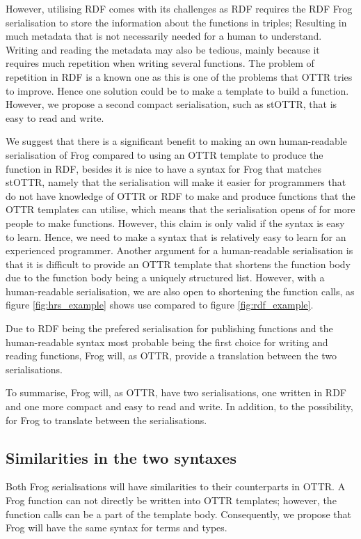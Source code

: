 \para
However, utilising RDF comes with its challenges as RDF requires the RDF Frog serialisation to store the information about the functions in triples; Resulting in much metadata that is not necessarily needed for a human to understand. Writing and reading the metadata may also be tedious, mainly because it requires much repetition when writing several functions. The problem of repetition in RDF is a known one as this is one of the problems that OTTR tries to improve. Hence one solution could be to make a template to build a function. However, we propose a second compact serialisation, such as stOTTR, that is easy to read and write. 

\para
We suggest that there is a significant benefit to making an own human-readable serialisation of Frog compared to using an OTTR template to produce the function in RDF, besides it is nice to have a syntax for Frog that matches stOTTR, namely that the serialisation will make it easier for programmers that do not have knowledge of OTTR or RDF to make and produce functions that the OTTR templates can utilise, which means that the serialisation opens of for more people to make functions. However, this claim is only valid if the syntax is easy to learn. Hence, we need to make a syntax that is relatively easy to learn for an experienced programmer. Another argument for a human-readable serialisation is that it is difficult to provide an OTTR template that shortens the function body due to the function body being a uniquely structured list. However, with a human-readable serialisation, we are also open to shortening the function calls, as figure \ref{fig:hrs_example} shows use compared to figure \ref{fig:rdf_example}. 

\para
Due to RDF being the prefered serialisation for publishing functions and the human-readable syntax most probable being the first choice for writing and reading functions, Frog will, as OTTR, provide a translation between the two serialisations. 

\para
To summarise, Frog will, as OTTR, have two serialisations, one written in RDF and one more compact and easy to read and write. In addition, to the possibility, for Frog to translate between the serialisations.

\subsection{Similarities in the two syntaxes}
Both Frog serialisations will have similarities to their counterparts in OTTR. A Frog function can not directly be written into OTTR templates; however, the function calls can be a part of the template body. Consequently, we propose that Frog will have the same syntax for terms and types. 

